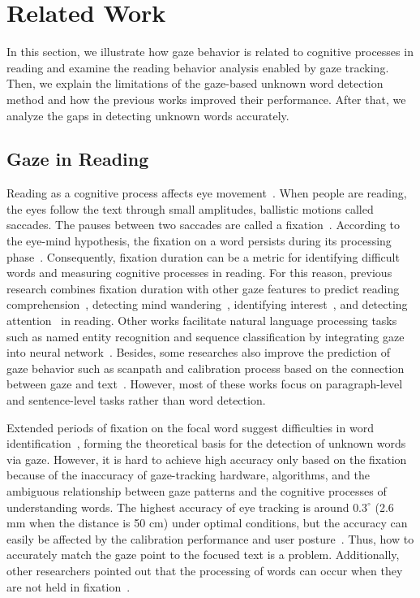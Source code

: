 \section{Related Work}
In this section, we illustrate how gaze behavior is related to cognitive processes in reading and examine the reading behavior analysis enabled by gaze tracking. Then, we explain the limitations of the gaze-based unknown word detection method and how the previous works improved their performance. After that, we analyze the gaps in detecting unknown words accurately.

\subsection{Gaze in Reading}
\label{sec:related_word_gaze}
Reading as a cognitive process affects eye movement~\cite{just1980theory}. When people are reading, the eyes follow the text through small amplitudes, ballistic motions called saccades. The pauses between two saccades are called a fixation~\cite{idict2006hyrskykari}. According to the eye-mind hypothesis, the fixation on a word persists during its processing phase~\cite{just1980theory}. Consequently, fixation duration can be a metric for identifying difficult words and measuring cognitive processes in reading. For this reason, previous research combines fixation duration with other gaze features to predict reading comprehension~\cite{cheng_gaze-based_2015, okoso_towards_2015,sanches_using_2017}, detecting mind wandering~\cite{bixler_automatic_2016}, identifying interest~\cite{wikigaze_2020_dubey}, and detecting attention~\cite{li_multimodal_2016, zermiani-etal-2024-interead, hollenstein-etal-2020-zuco} in reading. Other works facilitate natural language processing tasks such as named entity recognition and sequence classification by integrating gaze into neural network~\cite{sentiment_long_21,barrett2020sequence, barrett-etal-2018-sequence, ner_Hollenstein_2019}. Besides, some researches also improve the prediction of gaze behavior such as scanpath and calibration process based on the connection between gaze and text~\cite{TSM_NEURIPS2020_460191c7,eyettention_2023, CalibRead_2024_liu}. However, most of these works focus on paragraph-level and sentence-level tasks rather than word detection.

Extended periods of fixation on the focal word suggest difficulties in word identification~\cite{idict2006hyrskykari}, forming the theoretical basis for the detection of unknown words via gaze. However, it is hard to achieve high accuracy only based on the fixation because of the inaccuracy of gaze-tracking hardware, algorithms, and the ambiguous relationship between gaze patterns and the cognitive processes of understanding words. The highest accuracy of eye tracking is around $0.3^\circ$ (2.6 mm when the distance is 50 cm) under optimal conditions, but the accuracy can easily be affected by the calibration performance and user posture~\cite{eye_tracking2022liu}. Thus, how to accurately match the gaze point to the focused text is a problem. Additionally, other researchers pointed out that the processing of words can occur when they are not held in fixation~\cite{rayner1998eye}. 

